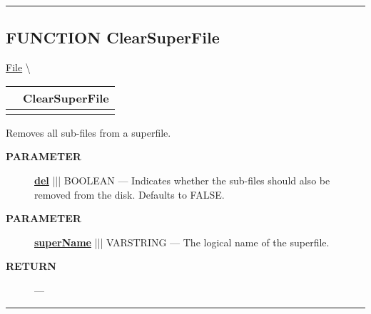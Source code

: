 \rule{\linewidth}{0.5pt}
\subsection*{\textsf{\colorbox{headtoc}{\color{white} FUNCTION}
ClearSuperFile}}

\hypertarget{ecldoc:file.clearsuperfile}{}
\hspace{0pt} \hyperlink{ecldoc:File}{File} \textbackslash 

{\renewcommand{\arraystretch}{1.5}
\begin{tabularx}{\textwidth}{|>{\raggedright\arraybackslash}l|X|}
\hline
\hspace{0pt}\mytexttt{\color{red} } & \textbf{ClearSuperFile} \\
\hline
\multicolumn{2}{|>{\raggedright\arraybackslash}X|}{\hspace{0pt}\mytexttt{\color{param} (varstring superName, boolean del=FALSE)}} \\
\hline
\end{tabularx}
}

\par





Removes all sub-files from a superfile.






\par
\begin{description}
\item [\colorbox{tagtype}{\color{white} \textbf{\textsf{PARAMETER}}}] \textbf{\underline{del}} ||| BOOLEAN --- Indicates whether the sub-files should also be removed from the disk. Defaults to FALSE.
\item [\colorbox{tagtype}{\color{white} \textbf{\textsf{PARAMETER}}}] \textbf{\underline{superName}} ||| VARSTRING --- The logical name of the superfile.
\end{description}







\par
\begin{description}
\item [\colorbox{tagtype}{\color{white} \textbf{\textsf{RETURN}}}] \textbf{} --- 
\end{description}




\rule{\linewidth}{0.5pt}
